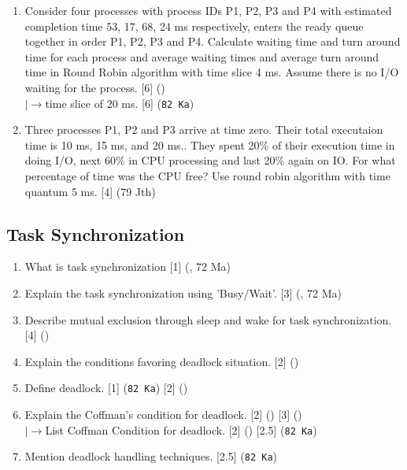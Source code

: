 \documentclass[12pt]{article}
\newcommand{\lb}{\\$\left|\rightarrow\right.$}
\begin{document}
\begin{enumerate}
      \item Consider four processes with process IDs P1, P2, P3 and P4 with estimated completion time 53, 17, 68, 24 ms respectively, enters the ready queue together in order P1, P2, P3 and P4. Calculate waiting time and turn around time for each process and average waiting times and average turn around time in Round Robin algorithm with time slice 4 ms. Assume there is no I/O waiting for the process. \hfill [6] ()
        \lb time slice of 20 ms. \hfill [6] (\texttt{82 Ka})

      \item Three processes P1, P2 and P3 arrive at time zero. Their total executaion time is 10 ms, 15 ms, and 20 ms.. They spent 20\% of their execution time in doing I/O, next 60\% in CPU processing and last 20\% again on IO. For what percentage of time was the CPU free? Use round robin algorithm with time quantum 5 ms. \hfill [4] (79 Jth)
    \end{enumerate}

  \subsection{Task Synchronization}
    \begin{enumerate}
      \item What is task synchronization \hfill [1] (, 72 Ma)

      \item Explain the task synchronization using 'Busy/Wait'. \hfill [3] (, 72 Ma)

      \item Describe mutual exclusion through sleep and wake for task synchronization. \hfill [4] ()

      \item Explain the conditions favoring deadlock situation. \hfill [2] ()

      \item Define deadlock. \hfill [1] (\texttt{82 Ka}) [2] ()
      
      \item Explain the Coffman's condition for deadlock. \hfill [2] () [3] ()
        \lb List Coffman Condition for deadlock. [2] () [2.5] (\texttt{82 Ka})

      \item Mention deadlock handling techniques. \hfill [2.5] (\texttt{82 Ka})
    \end{enumerate}
\end{document}
